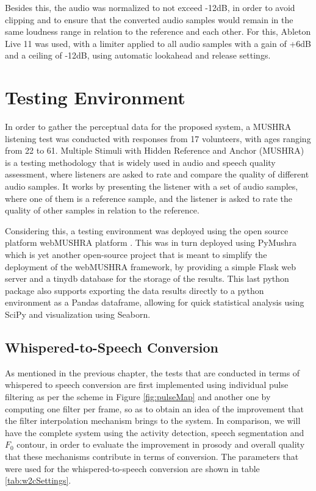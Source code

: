 Besides this, the audio was normalized to not exceed -12dB, in order to avoid clipping and to ensure that the converted audio samples would remain in the same loudness range in relation to the reference and each other. For this, Ableton Live 11 was used, with a limiter applied to all audio samples with a gain of +6dB and a ceiling of -12dB, using automatic lookahead and release settings. 

\section{Testing Environment}

In order to gather the perceptual data for the proposed system, a MUSHRA listening test was conducted with responses from 17 volunteers, with ages ranging from 22 to 61. Multiple Stimuli with Hidden Reference and Anchor (MUSHRA) \cite{internationaltelecommunicationunionBS15343Method2015} is a testing methodology that is widely used in audio and speech quality assessment, where listeners are asked to rate and compare the quality of different audio samples. It works by presenting the listener with a set of audio samples, where one of them is a reference sample, and the listener is asked to rate the quality of other samples in relation to the reference.

Considering this, a testing environment was deployed using the open source platform webMUSHRA platform \cite{schoefflerWebMUSHRAComprehensiveFramework2018}. This was in turn deployed using PyMushra which is yet another open-source project that is meant to simplify the deployment of the webMUSHRA framework, by providing a simple Flask web server and a tinydb database for the storage of the results. This last python package also supports exporting the data results directly to a python environment as a Pandas dataframe, allowing for quick statistical analysis using SciPy and visualization using Seaborn.


\subsection{Whispered-to-Speech Conversion}

As mentioned in the previous chapter, the tests that are conducted in terms of whispered to speech conversion are first implemented using individual pulse filtering as per the scheme in Figure \ref{fig:pulseMap} and another one by computing one filter per frame, so as to obtain an idea of the improvement that the filter interpolation mechanism brings to the system. In comparison, we will have the complete system using the activity detection, speech segmentation and $F_0$ contour, in order to evaluate the improvement in prosody and overall quality that these mechanisms contribute in terms of conversion. The parameters that were used for the whispered-to-speech conversion are shown in table \ref{tab:w2cSettings}.


